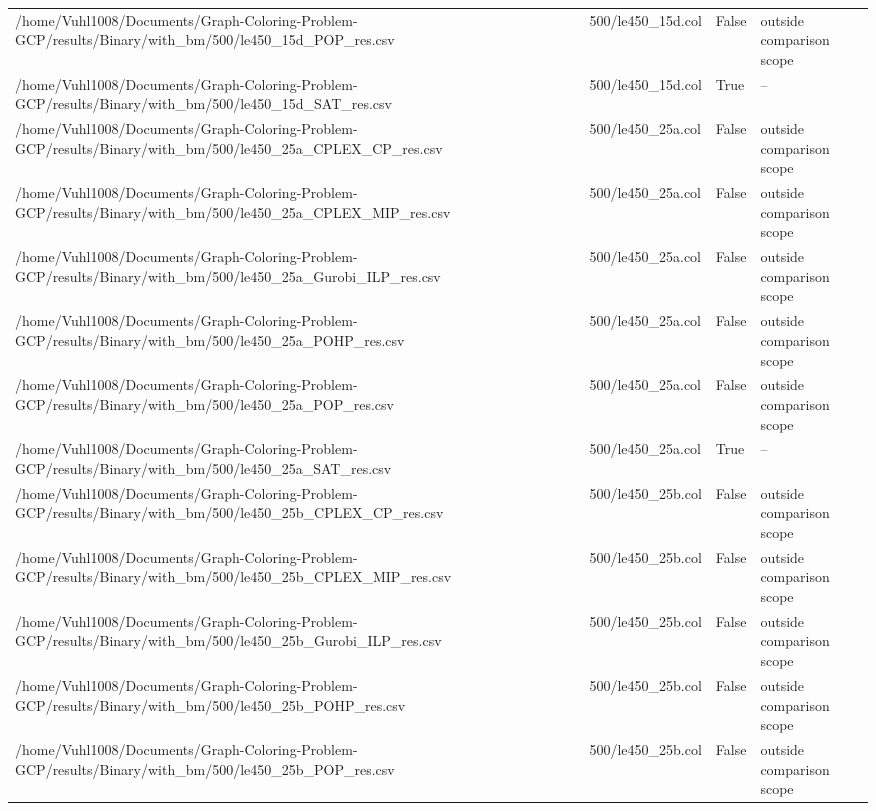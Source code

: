 \begin{table}[htbp]
\begin{tabular}{llll}
/home/Vuhl1008/Documents/Graph-Coloring-Problem-GCP/results/Binary/with\_bm/500/le450\_15d\_POP\_res.csv & 500/le450\_15d.col & False & outside comparison scope \\
/home/Vuhl1008/Documents/Graph-Coloring-Problem-GCP/results/Binary/with\_bm/500/le450\_15d\_SAT\_res.csv & 500/le450\_15d.col & True & -- \\
/home/Vuhl1008/Documents/Graph-Coloring-Problem-GCP/results/Binary/with\_bm/500/le450\_25a\_CPLEX\_CP\_res.csv & 500/le450\_25a.col & False & outside comparison scope \\
/home/Vuhl1008/Documents/Graph-Coloring-Problem-GCP/results/Binary/with\_bm/500/le450\_25a\_CPLEX\_MIP\_res.csv & 500/le450\_25a.col & False & outside comparison scope \\
/home/Vuhl1008/Documents/Graph-Coloring-Problem-GCP/results/Binary/with\_bm/500/le450\_25a\_Gurobi\_ILP\_res.csv & 500/le450\_25a.col & False & outside comparison scope \\
/home/Vuhl1008/Documents/Graph-Coloring-Problem-GCP/results/Binary/with\_bm/500/le450\_25a\_POHP\_res.csv & 500/le450\_25a.col & False & outside comparison scope \\
/home/Vuhl1008/Documents/Graph-Coloring-Problem-GCP/results/Binary/with\_bm/500/le450\_25a\_POP\_res.csv & 500/le450\_25a.col & False & outside comparison scope \\
/home/Vuhl1008/Documents/Graph-Coloring-Problem-GCP/results/Binary/with\_bm/500/le450\_25a\_SAT\_res.csv & 500/le450\_25a.col & True & -- \\
/home/Vuhl1008/Documents/Graph-Coloring-Problem-GCP/results/Binary/with\_bm/500/le450\_25b\_CPLEX\_CP\_res.csv & 500/le450\_25b.col & False & outside comparison scope \\
/home/Vuhl1008/Documents/Graph-Coloring-Problem-GCP/results/Binary/with\_bm/500/le450\_25b\_CPLEX\_MIP\_res.csv & 500/le450\_25b.col & False & outside comparison scope \\
/home/Vuhl1008/Documents/Graph-Coloring-Problem-GCP/results/Binary/with\_bm/500/le450\_25b\_Gurobi\_ILP\_res.csv & 500/le450\_25b.col & False & outside comparison scope \\
/home/Vuhl1008/Documents/Graph-Coloring-Problem-GCP/results/Binary/with\_bm/500/le450\_25b\_POHP\_res.csv & 500/le450\_25b.col & False & outside comparison scope \\
/home/Vuhl1008/Documents/Graph-Coloring-Problem-GCP/results/Binary/with\_bm/500/le450\_25b\_POP\_res.csv & 500/le450\_25b.col & False & outside comparison scope \\

\end{tabular}
\end{table}
